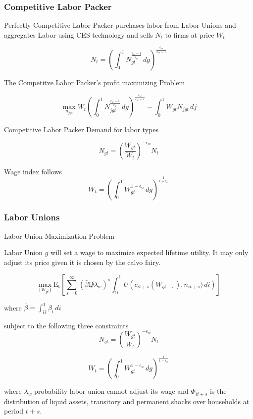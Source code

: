 \documentclass[titlepage]{\econtex}\providecommand{\texname}{BufferStockTheory}
\begin{document}
\hypertarget{Competitive Labor Packer}{}
\subsubsection{Competitive Labor Packer}



Perfectly Competitive Labor Packer purchases labor from Labor Unions and  aggregates Labor using CES technology and sells $N_{t}$ to firms at price $W_{t}$


$$ N_{t} = \left(\int_{0}^{1} N_{gt}^{\frac{\epsilon_{w}-1}{\epsilon_{w}}}\,dg\right)^{\frac{\epsilon_{w}}{\epsilon_{w}-1}}$$

The Competitve Labor Packer's profit maximizing Problem 

$$ \max_{n_{jgt}} W_{t} \left(\int_{0}^{1} N_{jgt}^{\frac{\epsilon_{w}-1}{\epsilon_{w}}} \, dg \right)^ {\frac{\epsilon_{w}}{\epsilon_{w}-1}} - \int_{0}^{1} W_{gt}N_{jgt}\, dj $$


 Competitive Labor Packer Demand for labor types

$$ N_{gt} = \left(\frac{W_{gt}}{W_{t}}\right)^{-\epsilon_{w}} N_{t} $$

Wage index follows
$$ W_{t} = \left(\int_{0}^{1} W_{gt}^{1-\epsilon_{w}}\,dg\right)^{\frac{1}{1-\epsilon_{w}}}$$




\hypertarget{Labor Unions}{}
\subsubsection{Labor Unions}

Labor Union Maximization Problem

Labor Union $g$ will set a wage to maximize expected lifetime utility. It may only adjust its price given it is chosen by the calvo fairy. 

$$ \max_{\{W_{gt}\}} \mathrm{E_{t}}\left[\sum_{s=0}^{\infty} (\bar{\beta} \not D \lambda_{w})^{s} \int_{\mho}^{1}  U\left (c_{it+s}(W_{gt+s}), n_{i t+s}) \, di \right)\right] $$

where $\bar{\beta} = \int_{\mho}^{1} \beta_{i} \, di$

subject to the following three constraints $$ N_{gt} = \left(\frac{W_{gt}}{W_{t}}\right)^{-\epsilon_{w}} N_{t} $$

$$ W_{t} = \left(\int_{0}^{1} W_{gt}^{1-\epsilon_{w}}\,dg\right)^{\frac{1}{1-\epsilon_{w}}}$$

where $\lambda_{w}$ probability labor union cannot adjust its wage and $\Phi_{it+s}$ is the distribution of  liquid assets, transitory and permanent shocks over households at period $t+s$. \\
\end{document}
